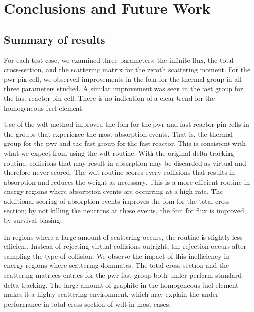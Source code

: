 
\chapter{Conclusions and Future Work}
\label{chap:conclusion}


\section{Summary of results}
\label{sec:results_summary}

For each test case, we examined three parameters: the infinite flux,
the total cross-section, and the scattering matrix for the zeroth
scattering moment. For the \gls{pwr} pin cell, we observed
improvements in the \gls{fom} for the thermal group in all three
parameters studied. A similar improvement was seen in the fast group
for the fast reactor pin cell. There is no indication of a clear trend
for the homogeneous fuel element.

Use of the \gls{wdt} method improved the \gls{fom} for the \gls{pwr}
and fast reactor pin cells in the groups that experience the most
absorption events. That is, the thermal group for the \gls{pwr} and
the fast group for the fast reactor. This is consistent with what we
expect from using the \gls{wdt} routine. With the original
delta-tracking routine, collisions that may result in absorption may
be discarded as virtual and therefore never scored. The \gls{wdt}
routine scores every collisions that results in absorption and reduces
the weight as necessary. This is a more efficient routine in energy
regions where absorption events are occurring at a high rate. The
additional scoring of absorption events improves the \gls{fom} for the
total cross-section; by not killing the neutrons at these events, the
\gls{fom} for flux is improved by survival biasing. 

In regions where a large amount of scattering occurs, the routine is
slightly less efficient. Instead of rejecting virtual collisions
outright, the rejection occurs after sampling the type of
collision. We observe the impact of this inefficiency in energy
regions where scattering dominates. The total cross-section and the
scattering matrices entries for the \gls{pwr} fast group both under
perform standard delta-tracking. The large amount of graphite in the
homogeneous fuel element makes it a highly scattering environment,
which may explain the under-performance in total cross-section of
\gls{wdt} in most cases.

